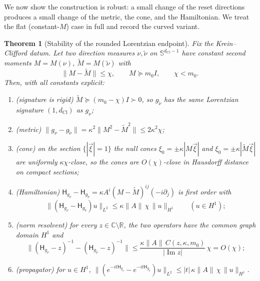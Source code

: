 \documentclass[11pt]{article}
\newtheorem{theorem}{Theorem}[section]
\theoremstyle{definition}
\theoremstyle{remark}
\newcommand{\R}{\mathbb{R}}
\newcommand{\C}{\mathbb{C}}
\newcommand{\dCl}{d_{\mathrm{Cl}}}
\newcommand{\Sphere}{\mathbb{S}}
\newcommand{\Ham}{\mathsf{H}}
\newcommand{\norm}[1]{\lVert#1\rVert}
\begin{document}
We now show the construction is robust: a small change of the reset directions
produces a small change of the metric, the cone, and the Hamiltonian.  We treat
the flat (constant-$M$) case in full and record the curved variant.

\begin{theorem}[Stability of the rounded Lorentzian endpoint]
\label{thm:stability}
Fix the Krein--Clifford datum.  Let two direction measures $\nu,\tilde\nu$ on
$\Sphere^{\dCl-1}$ have constant second moments $M=M(\nu)$, $\tilde M=M(\tilde\nu)$
with
\[
  \norm{M-\tilde M}\le\chi,
  \qquad M\succeq m_0 I,\qquad \chi<m_0 .
\]
Then, with all constants explicit:
\begin{enumerate}[label=\textup{(\roman*)},leftmargin=2.4em]
\item \textup{(signature is rigid)} $\tilde M\succeq(m_0-\chi)I\succ0$, so
      $g_{\tilde\nu}$ has the same Lorentzian signature $(1,\dCl)$ as $g_\nu$;
\item \textup{(metric)} $\norm{g_\nu-g_{\tilde\nu}}=\kappa^2\norm{M^2-\tilde
      M^2}\le 2\kappa^2\chi$;
\item \textup{(cone)} on the section $\{|\vec\xi|=1\}$ the null cones
      $\xi_0=\pm\kappa|M\vec\xi|$ and $\xi_0=\pm\kappa|\tilde M\vec\xi|$ are
      uniformly $\kappa\chi$-close, so the cones are $O(\chi)$-close in Hausdorff
      distance on compact sections;
\item \textup{(Hamiltonian)} $\Ham_{g_\nu}-\Ham_{g_{\tilde\nu}}
      =\kappa A^i(M-\tilde M)^{ij}(-i\partial_j)$ is first order with
      \[
        \norm{(\Ham_{g_\nu}-\Ham_{g_{\tilde\nu}})u}_{L^2}
        \le\kappa\norm{A}\,\chi\,\norm{u}_{H^1}\qquad(u\in H^1);
      \]
\item \textup{(norm resolvent)} for every $z\in\C\setminus\R$, the two operators
      have the common graph domain $H^1$ and
      \[
        \norm{(\Ham_{g_\nu}-z)^{-1}-(\Ham_{g_{\tilde\nu}}-z)^{-1}}
        \le \frac{\kappa\norm{A}\,C(z,\kappa,m_0)}{|\operatorname{Im}z|}\,\chi
        =O(\chi);
      \]
\item \textup{(propagator)} for $u\in H^1$,
      $\norm{(e^{-it\Ham_{g_\nu}}-e^{-it\Ham_{g_{\tilde\nu}}})u}_{L^2}
      \le|t|\,\kappa\norm{A}\,\chi\,\norm{u}_{H^1}$.
\end{enumerate}
\end{theorem}
\end{document}
